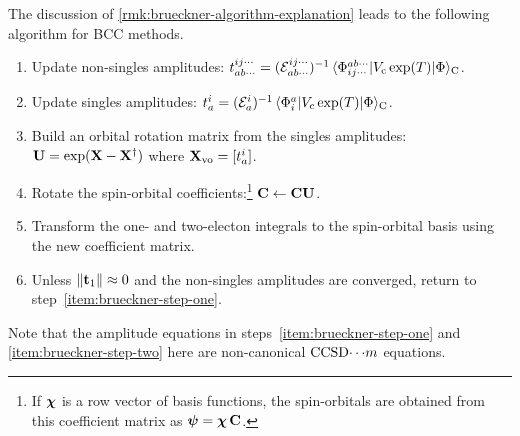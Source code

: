 \documentclass[11pt]{article}
\numberwithin{equation}{section}
\begin{document}
\begin{rmk}
The discussion of \cref{rmk:brueckner-algorithm-explanation} leads to the following algorithm for BCC methods.
\begin{enumerate}
\item
\label{item:brueckner-step-one}
Update non-singles amplitudes:
$
  t_{ab\cdots}^{ij\cdots}
=
  (\mathcal{E}_{ab\cdots}^{ij\cdots})^{-1}\,
  \langle\Phi _{ij\cdots}^{ab\cdots}|
    V_{\mathrm{c}}\,
    \mathrm{exp}(T)
  |\Phi \rangle_{\mathrm{C}}
$.

\item
\label{item:brueckner-step-two}
Update singles amplitudes:
$
  t_a^i
=
  (\mathcal{E}_a^i)^{-1}\,
  \langle\Phi _i^a|
    V_{\mathrm{c}}\,
    \mathrm{exp}(T)
  |\Phi \rangle_{\mathrm{C}}
$.

\item
Build an orbital rotation matrix from the singles amplitudes:
$
  \mathbf{U}
=
  \mathrm{exp}(\mathbf{X} - \mathbf{X}^\dagger)
$
where
$
  \mathbf{X}_{\mathrm{vo}}
=
  [t_a^i]
$.

\item
Rotate the spin-orbital coefficients:\footnote{
  If $\bm{\x}$ is a row vector of basis functions, the spin-orbitals are obtained from this coefficient matrix as
  $\bm{\y}=\bm{\x}\,\bo{C}$.
}
$
  \mathbf{C}
\leftarrow
  \mathbf{C}\mathbf{U}
$.

\item
Transform the one- and two-electon integrals to the spin-orbital basis using the new coefficient matrix.

\item
Unless $\|\mathbf{t}_1\|\approx0$ and the non-singles amplitudes are converged, return to step~\ref{item:brueckner-step-one}.
\end{enumerate}
Note that the amplitude equations in steps~\ref{item:brueckner-step-one} and \ref{item:brueckner-step-two} here are non-canonical $\mathrm{CCSD}{\cdots}m$ equations.
\end{rmk}
\end{document}
